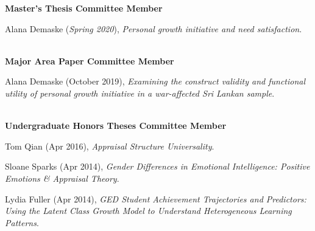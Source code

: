 {\large \textbf{Master's Thesis Committee Member}}%
\begin{etaremune}%
\item Alana Demaske (\textit{Spring 2020}), \textit{Personal growth initiative and need satisfaction}.%
\end{etaremune}\\

{\large \textbf{Major Area Paper Committee Member}}%
\begin{etaremune}%
\item Alana Demaske (October 2019), \textit{Examining the construct validity and functional utility of personal growth initiative in a war-affected Sri Lankan sample}.%
\end{etaremune}\\
%
{\large \textbf{Undergraduate Honors Theses Committee Member}}
\begin{etaremune}\item Tom Qian (Apr 2016), \textit{Appraisal Structure Universality}.%
%
\item Sloane Sparks (Apr 2014), \textit{Gender Differences in Emotional Intelligence: Positive Emotions \& Appraisal Theory}.%
\item Lydia Fuller (Apr 2014), \textit{GED Student Achievement Trajectories and Predictors: Using the Latent Class Growth Model to Understand Heterogeneous Learning Patterns}.%
\end{etaremune}
